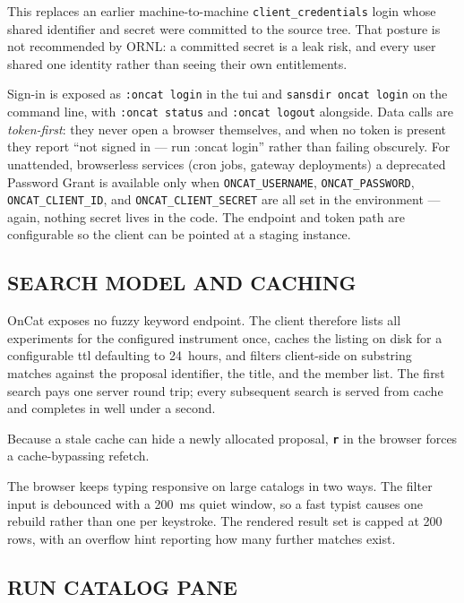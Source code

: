 \documentclass[tm]{ornltm}
\newcommand{\key}[1]{\textbf{\texttt{#1}}}
\begin{document}
This replaces an earlier machine-to-machine \texttt{client\_credentials} login
whose shared identifier and secret were committed to the source tree. That
posture is not recommended by ORNL: a committed secret is a leak risk, and every
user shared one identity rather than seeing their own entitlements.

Sign-in is exposed as \texttt{:oncat login} in the \ac{tui} and
\texttt{sansdir oncat login} on the command line, with \texttt{:oncat status}
and \texttt{:oncat logout} alongside. Data calls are \emph{token-first}: they
never open a browser themselves, and when no token is present they report
``not signed in --- run :oncat login'' rather than failing obscurely. For
unattended, browserless services (cron jobs, gateway deployments) a deprecated
Password Grant is available only when \texttt{ONCAT\_USERNAME},
\texttt{ONCAT\_PASSWORD}, \texttt{ONCAT\_CLIENT\_ID}, and
\texttt{ONCAT\_CLIENT\_SECRET} are all set in the environment --- again, nothing
secret lives in the code. The endpoint and token path are configurable so the
client can be pointed at a staging instance.

\subsection{SEARCH MODEL AND CACHING}

OnCat exposes no fuzzy keyword endpoint. The client therefore lists all
experiments for the configured instrument once, caches the listing on disk for a
configurable \ac{ttl} defaulting to 24~hours, and filters client-side on
substring matches against the proposal identifier, the title, and the member
list. The first search pays one server round trip; every subsequent search is
served from cache and completes in well under a second.

Because a stale cache can hide a newly allocated proposal, \key{r} in the browser
forces a cache-bypassing refetch.

The browser keeps typing responsive on large catalogs in two ways. The filter
input is debounced with a 200~ms quiet window, so a fast typist causes one
rebuild rather than one per keystroke. The rendered result set is capped at 200
rows, with an overflow hint reporting how many further matches exist.

\subsection{RUN CATALOG PANE}
\end{document}

